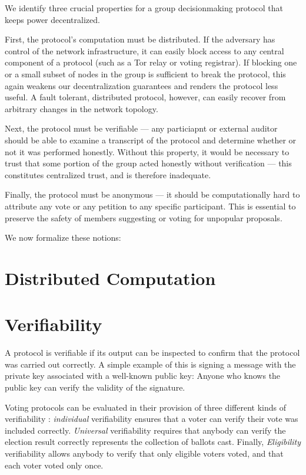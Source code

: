 We identify three crucial properties for a group decisionmaking protocol that
keeps power decentralized.

First, the protocol's computation must be distributed. If the adversary has
control of the network infrastructure, it can easily block access to any central
component of a protocol (such as a Tor relay \tocite or voting
registrar). If blocking one or a small
subset of nodes in the group is sufficient to break the protocol, this again
weakens our decentralization guarantees and renders the protocol less useful. A
fault tolerant, distributed protocol, however, can easily recover from arbitrary
changes in the network topology.

Next, the protocol must be verifiable --- any particiapnt or external auditor
should be able to examine a transcript of the protocol and determine whether or
not it was performed honestly. Without this property, it would be necessary to
trust that some portion of the group acted honestly without verification ---
this constitutes centralized trust, and is therefore inadequate.

Finally, the protocol must be anonymous --- it should be computationally hard to
attribute any vote or any petition to any specific participant. This is
essential to preserve the safety of members suggesting or voting for unpopular
proposals.

We now formalize these notions:
\section{Distributed Computation}\label{Subsection:distr}
\section{Verifiability}\label{Subsection:verif}
A protocol is verifiable if its output can be inspected to confirm that the
protocol was carried out correctly. A simple example of this is signing a
message with the private key associated with a well-known public key: Anyone
who knows the public key can verify the validity of the signature.

Voting protocols can be evaluated in their provision of three different
kinds of verifiability \cite{kremer_election_2010}: \emph{individual}
verifiability ensures that a voter can verify their vote was included
correctly. \emph{Universal} verifiability requires that anybody can verify
the election result correctly represents the collection of ballots cast.
Finally, \emph{Eligibility} verifiability allows anybody to verify that
only eligible voters voted, and that each voter voted only once.

